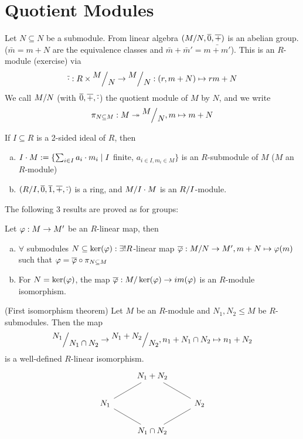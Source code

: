 \documentclass[a4paper]{report}
\begin{document}
\section{Quotient Modules}
\begin{defi}
  Let $N \subseteq N$ be a submodule. From linear algebra $(\fak MN, \bar 0, \bar +)$ is an abelian group. ($\bar m = m + N$ are the equivalence classes and $\bar m + \bar m' = \bar{m+m'}$). This is an $R$-module (exercise) via \[\bar \cd : R \tm \fak MN \to \fak MN: (r, m+N) \mps rm + N\]
  We call $\fak MN$ (with $\overline 0, \overline +, \overline {\cdot}$) the quotient module of $M$ by $N$, and we write \[\pi_{N \subseteq M}: M \twoheadrightarrow \fak MN, m \mps m+N\]
\end{defi}
\begin{defi}
  If $I \subseteq R$ is a 2-sided ideal of $R$, then
  \begin{enumerate}[(a)]
    \item $I \cdot M := \{\sum_{i \in I} a_{i} \cdot m_{i} \mid I$ finite, $a_{i \in I, m_{i} \in M}\}$ is an $R$-submodule of $M$ ($M$ an $R$-module)
          \item $(\fak RI, \bar 0, \bar 1, \bar +, \bar \cd)$ is a ring, and $\fak M{I \cd M}$ is an $\fak RI$-module.
  \end{enumerate}
\end{defi}
The following 3 results are proved as for groups:
\begin{thm}
  Let $\varphi: M \to M'$ be an $R$-linear map, then
  \begin{enumerate}[(a)]
    \item $\forall$ submodules $N \subseteq \ker(\varphi): \exists ! R$-linear map $\bar \ph : \fak MN \to M', m+N \mps \ph(m)$ such that $\varphi = \overline {\varphi} \circ \pi_{N \subseteq M}$
          \item For $N = \ker(\varphi)$, the map $\bar \ph : \fak M{\ker(\ph)} \to im(\ph)$ is an $R$-module isomorphism.
  \end{enumerate}
\end{thm}
\begin{thm}(First isomorphism theorem)
  Let $M$ be an $R$-module and $N_{1}, N_{2} \le M$ be $R$-submodules. Then the map \[\fak {N_{1}}{N_{1} \cap N_{2}} \to \fak {N_{1} + N_{2}}{N_{2}}, n_{1} + N_{1} \cap N_{2} \mps n_{1} + N_{2}\]
  is a well-defined $R$-linear isomorphism.
  \[\begin{tikzcd}
                        & N_1+N_2 \arrow[ld, no head]      &                         \\
N_1 \arrow[rd, no head] &                                  & N_2 \arrow[lu, no head] \\
                        & N_1 \cap N_2 \arrow[ru, no head] &
\end{tikzcd}\]
\end{thm}
\end{document}
